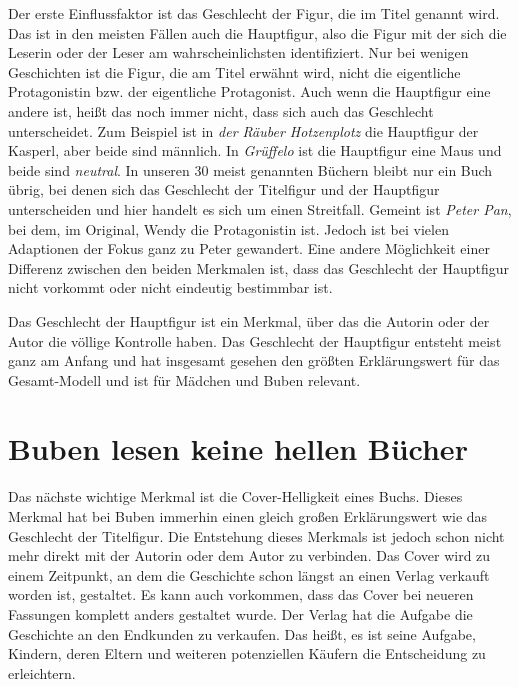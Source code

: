Der erste Einflussfaktor ist das Geschlecht der Figur, die im Titel
genannt wird. Das ist in den meisten Fällen auch die Hauptfigur, also
die Figur mit der sich die Leserin oder der Leser am wahrscheinlichsten
identifiziert. Nur bei wenigen Geschichten ist die Figur, die am Titel
erwähnt wird, nicht die eigentliche Protagonistin bzw. der eigentliche
Protagonist. Auch wenn die Hauptfigur eine andere ist, heißt das noch
immer nicht, dass sich auch das Geschlecht unterscheidet. Zum Beispiel
ist in \emph{der Räuber Hotzenplotz} die Hauptfigur der Kasperl, aber
beide sind männlich. In \emph{Grüffelo} ist die Hauptfigur eine Maus und
beide sind \emph{neutral}. In unseren 30 meist genannten Büchern bleibt
nur ein Buch übrig, bei denen sich das Geschlecht der Titelfigur und der
Hauptfigur unterscheiden und hier handelt es sich um einen Streitfall.
Gemeint ist \emph{Peter Pan}, bei dem, im Original, Wendy die
Protagonistin ist. Jedoch ist bei vielen Adaptionen der Fokus ganz zu
Peter gewandert. Eine andere Möglichkeit einer Differenz zwischen den
beiden Merkmalen ist, dass das Geschlecht der Hauptfigur nicht vorkommt
oder nicht eindeutig bestimmbar ist.

Das Geschlecht der Hauptfigur ist ein Merkmal, über das die Autorin oder
der Autor die völlige Kontrolle haben. Das Geschlecht der Hauptfigur
entsteht meist ganz am Anfang und hat insgesamt gesehen den größten
Erklärungswert für das Gesamt-Modell und ist für Mädchen und Buben
relevant.

\section{Buben lesen keine hellen Bücher}

Das nächste wichtige Merkmal ist die Cover-Helligkeit eines Buchs.
Dieses Merkmal hat bei Buben immerhin einen gleich großen Erklärungswert
wie das Geschlecht der Titelfigur. Die Entstehung dieses Merkmals ist
jedoch schon nicht mehr direkt mit der Autorin oder dem Autor zu
verbinden. Das Cover wird zu einem Zeitpunkt, an dem die Geschichte
schon längst an einen Verlag verkauft worden ist, gestaltet. Es kann
auch vorkommen, dass das Cover bei neueren Fassungen komplett anders
gestaltet wurde. Der Verlag hat die Aufgabe die Geschichte an den
Endkunden zu verkaufen. Das heißt, es ist seine Aufgabe, Kindern, deren
Eltern und weiteren potenziellen Käufern die Entscheidung zu
erleichtern.


